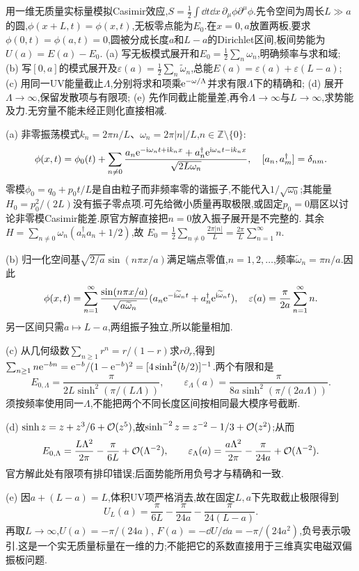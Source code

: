 \begin{exercise}
用一维无质量实标量模拟Casimir效应,$S=\frac12\int\dd t\dd x\,\partial_\mu\phi\partial^\mu\phi$.先令空间为周长$L\gg a$的圆,$\phi(x+L,t)=\phi(x,t)$,无板零点能为$E_0$.在$x=0,a$放置两板,要求$\phi(0,t)=\phi(a,t)=0$,圆被分成长度$a$和$L-a$的Dirichlet区间,板间势能为$U(a)=E(a)-E_0$.
(a) 写无板模式展开和$E_0=\frac12\sum_n\omega_n$,明确频率与求和域;
(b) 写$[0,a]$的模式展开及$\varepsilon(a)=\frac12\sum_n\widetilde\omega_n$,总能$E(a)=\varepsilon(a)+\varepsilon(L-a)$;
(c) 用同一UV能量截止$\Lambda$,分别将求和项乘$\mathrm e^{-\omega/\Lambda}$并求有限$\Lambda$下的精确和;
(d) 展开$\Lambda\to\infty$,保留发散项与有限项;
(e) 先作同截止能量差,再令$\Lambda\to\infty$与$L\to\infty$,求势能及力.无穷量不能未经正则化直接相减.
\end{exercise}
\begin{solution}
(a) 非零振荡模式$k_n=2\pi n/L$、$\omega_n=2\pi|n|/L$,$n\in\mathbb Z\setminus\{0\}$:
\[
 \phi(x,t)=\phi_0(t)+\sum_{n\ne0}\frac{a_n\mathrm e^{-\mathrm i\omega_nt+\mathrm i k_nx}+a_n^\dagger\mathrm e^{\mathrm i\omega_nt-\mathrm i k_nx}}{\sqrt{2L\omega_n}},
 \quad[a_n,a_m^\dagger]=\delta_{nm}.
\]
零模$\phi_0=q_0+p_0t/L$是自由粒子而非频率零的谐振子,不能代入$1/\sqrt{\omega_0}$;其能量$H_0=p_0^2/(2L)$没有振子零点项.可先给微小质量再取极限,或固定$p_0=0$扇区以讨论非零模Casimir能差.原官方解直接把$n=0$放入振子展开是不完整的.
其余$H=\sum_{n\ne0}\omega_n(a_n^\dagger a_n+1/2)$,故
$E_0=\frac12\sum_{n\ne0}\frac{2\pi|n|}{L}=\frac{2\pi}{L}\sum_{n=1}^\infty n$.

(b) 归一化空间基$\sqrt{2/a}\sin(n\pi x/a)$满足端点零值,$n=1,2,\ldots$,频率$\widetilde\omega_n=\pi n/a$.因此
\[
 \phi(x,t)=\sum_{n=1}^\infty\frac{\sin(n\pi x/a)}{\sqrt{a\widetilde\omega_n}}
 (a_n\mathrm e^{-\mathrm i\widetilde\omega_nt}+a_n^\dagger\mathrm e^{\mathrm i\widetilde\omega_nt}),
 \quad\varepsilon(a)=\frac\pi{2a}\sum_{n=1}^\infty n.
\]
另一区间只需$a\mapsto L-a$,两组振子独立,所以能量相加.

(c) 从几何级数$\sum_{n\ge1}r^n=r/(1-r)$求$r\partial_r$,得到
$\sum_{n\ge1}n\mathrm e^{-bn}=\mathrm e^{-b}/(1-\mathrm e^{-b})^2=[4\sinh^2(b/2)]^{-1}$.两个有限和是
\[
 E_{0,\Lambda}=\frac\pi{2L\sinh^2(\pi/(L\Lambda))},\qquad
 \varepsilon_\Lambda(a)=\frac\pi{8a\sinh^2(\pi/(2a\Lambda))}.
\]
须按频率使用同一$\Lambda$,不能把两个不同长度区间按相同最大模序号截断.

(d) $\sinh z=z+z^3/6+\mathcal O(z^5)$,故$\sinh^{-2}z=z^{-2}-1/3+\mathcal O(z^2)$;从而
\[
 E_{0,\Lambda}=\frac{L\Lambda^2}{2\pi}-\frac\pi{6L}+\mathcal O(\Lambda^{-2}),
 \qquad\varepsilon_\Lambda(a)=\frac{a\Lambda^2}{2\pi}-\frac\pi{24a}+\mathcal O(\Lambda^{-2}).
\]
官方解此处有限项有排印错误;后面势能所用负号才与精确和一致.

(e) 因$a+(L-a)=L$,体积UV项严格消去,故在固定$L,a$下先取截止极限得到
\[
 U_L(a)=\frac\pi{6L}-\frac\pi{24a}-\frac\pi{24(L-a)}.
\]
再取$L\to\infty$,$U(a)=-\pi/(24a)$,
$F(a)=-\dd U/\dd a=-\pi/(24a^2)$,负号表示吸引.这是一个实无质量标量在一维的力;不能把它的系数直接用于三维真实电磁双偏振板问题.
\end{solution}
